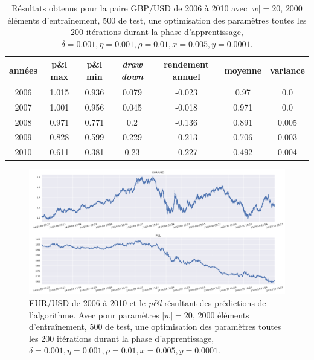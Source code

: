 \documentclass[a4paper, 11pt]{article}
\begin{document}
\begin{table}[h!]
	\centering
	\begin{tabular}{|c|c|c|c|c|c|c|}
		\hline
		années & p\&l max & p\&l min & \textit{draw down} & rendement annuel & moyenne & variance\\
		\hline
		2006 & 1.015 & 0.936 & 0.079 & -0.023 & 0.97 & 0.0\\
		\hline
		2007 & 1.001 & 0.956 & 0.045 & -0.018 & 0.971 & 0.0\\
		\hline
		2008 & 0.971 & 0.771 & 0.2 & -0.136 & 0.891 & 0.005\\
		\hline
		2009 & 0.828 & 0.599 & 0.229 & -0.213 & 0.706 & 0.003\\
		\hline
		2010 & 0.611 & 0.381 & 0.23 & -0.227 & 0.492 & 0.004\\
		\hline
	\end{tabular}
	\caption{Résultats obtenus pour la paire GBP/USD de 2006 à 2010 avec $|w| = 20$, $2000$ éléments d'entraînement, $500$ de test, une optimisation des
		paramètres toutes les $200$ itérations durant la phase d'apprentissage, $\delta = 0.001, \eta=0.001,\rho=0.01, x = 0.005, y=0.0001$.}
	\label{table gbp usd 2006 2010}
\end{table}

\begin{figure}
	\centering
	\includegraphics[scale=0.5]{res/eursud_2006-2010}
	\caption{EUR/USD de 2006 à 2010 et le \textit{p\&l} résultant des prédictions de l'algorithme. Avec pour paramètres $|w| = 20$, $2000$ éléments d'entraînement, $500$ de test, une optimisation des
		paramètres toutes les $200$ itérations durant la phase d'apprentissage, $\delta = 0.001, \eta=0.001,\rho=0.01, x = 0.005, y=0.0001$.}
\end{figure}
\end{document}
